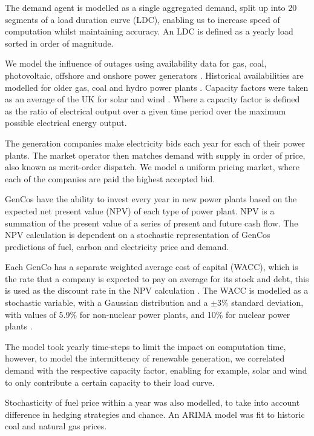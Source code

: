 The demand agent is modelled as a single aggregated demand, split up into 20 segments of a load duration curve (LDC), enabling us to increase speed of computation whilst maintaining accuracy. An LDC is defined as a yearly load sorted in order of magnitude. 

We model the influence of outages using availability data for gas, coal, photovoltaic, offshore and onshore power generators \cite{Ltd2016, Hunt2015, carroll-j}. Historical availabilities are modelled for older gas, coal and hydro power plants \cite{AlbertaSystemElectricOperator2016}. Capacity factors were taken as an average of the UK for solar and wind \cite{Pfenninger2016, Staffell2016}. Where a capacity factor is defined as the ratio of electrical output over a given time period over the maximum possible electrical energy output. 

The generation companies make electricity bids each year for each of their power plants. The market operator then matches demand with supply in order of price, also known as merit-order dispatch. We model a uniform pricing market, where each of the companies are paid the highest accepted bid.

GenCos have the ability to invest every year in new power plants based on the expected net present value (NPV) of each type of power plant. NPV is a summation of the present value of a series of present and future cash flow. The NPV calculation is dependent on a stochastic representation of GenCos predictions of fuel, carbon and electricity price and demand.

Each GenCo has a separate weighted average cost of capital (WACC), which is the rate that a company is expected to pay on average for its stock and debt, this is used as the discount rate in the NPV calculation \cite{KincheloeStephenC1990TWAC}. The WACC is modelled as a stochastic variable, with a Gaussian distribution and a $\pm3\%$ standard deviation, with values of 5.9\% for non-nuclear power plants, and 10\% for nuclear power plants \cite{KPMG2017, Paper2012}. 

The model took yearly time-steps to limit the impact on computation time, however, to model the intermittency of renewable generation, we correlated demand with the respective capacity factor, enabling for example, solar and wind to only contribute a certain capacity to their load curve.

Stochasticity of fuel price within a year was also modelled, to take into account difference in hedging strategies and chance. An ARIMA model \cite{ARIMA} was fit to historic coal and natural gas prices.



